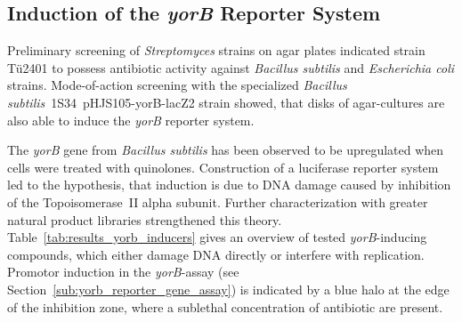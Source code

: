 

\subsection{Induction of the \textit{yorB} Reporter System} %
\label{sub:induction_of_the_yorb_reporter_system}

Preliminary screening of \emph{Streptomyces} strains on agar plates indicated strain Tü2401 to possess antibiotic activity against \emph{Bacillus subtilis} and \emph{Escherichia coli} strains.
Mode-of-action screening with the specialized \textit{Bacillus subtilis}~1S34~pHJS105-yorB-lacZ2 strain showed, that disks of agar-cultures are also able to induce the \emph{yorB} reporter system.

The \textit{yorB} gene from \textit{Bacillus subtilis} has been observed to be upregulated when cells were treated with quinolones.\autocite{Hutter2004a}
Construction of a luciferase reporter system led to the hypothesis, that induction is due to DNA damage caused by inhibition of the Topoisomerase~II alpha subunit.\autocite{Hutter2004}
Further characterization with greater natural product libraries strengthened this theory.\autocite{Mariner2011,Urban2007}
Table~\ref{tab:results_yorb_inducers} gives an overview of tested \textit{yorB}-inducing compounds, which either damage DNA directly or interfere with replication.
Promotor induction in the \emph{yorB}-assay (see Section~\ref{sub:yorb_reporter_gene_assay}) is indicated by a blue halo at the edge of the inhibition zone, where a sublethal concentration of antibiotic are present.


